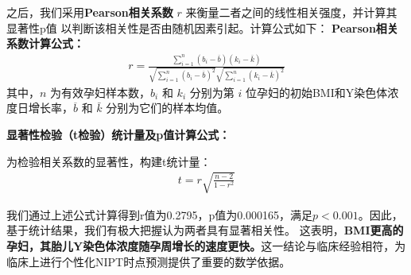 \documentclass{article}
\begin{document}
之后，我们采用\textbf{Pearson相关系数} $r$ 来衡量二者之间的线性相关强度，并计算其显著性p值
以判断该相关性是否由随机因素引起。计算公式如下：
\textbf{Pearson相关系数计算公式：}
\begin{gather}
    r=\frac{\sum_{i=1}^{n}(b_i-\overline{b})(k_i-\overline{k})}{\sqrt{\sum_{i=1}^{n}(b_i-\overline{b})^2}\sqrt{\sum_{i=1}^{n}(k_i-\overline{k})^2}} \tag{2}
\end{gather}
其中，$n$ 为有效孕妇样本数，$b_i$ 和 $k_i$ 分别为第 $i$ 位孕妇的初始BMI和Y染色体浓度日增长率，$\overline{b}$ 和 $\bar{k}$ 分别为它们的样本均值。

\textbf{显著性检验（t检验）统计量及p值计算公式：}

为检验相关系数的显著性，构建t统计量：
\begin{gather}
    t=r\sqrt{\frac{n-2}{1-r^2}}\tag{3}
\end{gather}

我们通过上述公式计算得到r值为0.2795，p值为0.000165，满足$p < 0.001$。因此，基于统计结果，我们有极大把握认为两者具有显著相关性。
这表明，\textbf{BMI更高的孕妇，其胎儿Y染色体浓度随孕周增长的速度更快。}这一结论与临床经验相符，为临床上进行个性化NIPT时点预测提供了重要的数学依据。
\end{document}
